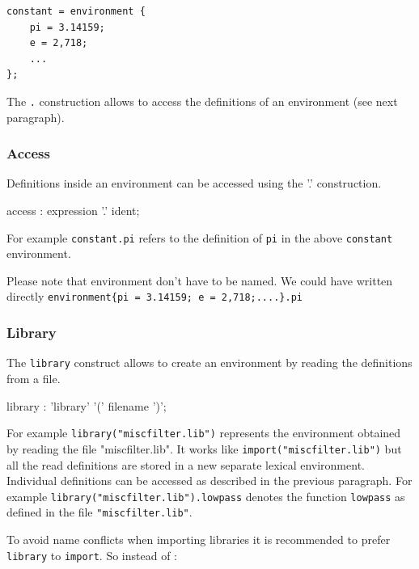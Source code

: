 \begin{lstlisting}
constant = environment {
	pi = 3.14159;
	e = 2,718;
	...
};
\end{lstlisting}
The  \lstinline'.' construction allows to access the definitions of an environment (see next paragraph).

\subsubsection{Access} 
Definitions inside an environment can be accessed using 
the '.' construction. 


\begin{rail}
access :    expression '.' ident;       
\end{rail}

For example \lstinline'constant.pi' refers to the definition of \lstinline'pi' in the above \lstinline'constant' environment.

Please note that environment don't have to be named. We could have written directly 
\lstinline'environment{pi = 3.14159; e = 2,718;....}.pi'

\subsubsection{Library} 
The \lstinline'library' construct allows to create an environment by reading the definitions from a file.

\begin{rail}
library :    'library' '(' filename ')';
\end{rail}

For example \lstinline'library("miscfilter.lib")' represents the environment 
obtained by reading the file "miscfilter.lib". It works like \lstinline'import("miscfilter.lib")' but all the read definitions are stored in a new separate lexical environment. Individual definitions can be accessed as described in the previous paragraph. For example \lstinline'library("miscfilter.lib").lowpass' denotes the function \lstinline'lowpass' as defined in the file \lstinline'"miscfilter.lib"'.

To avoid name conflicts when importing libraries it is recommended to prefer \lstinline'library' to \lstinline'import'. So instead of :

